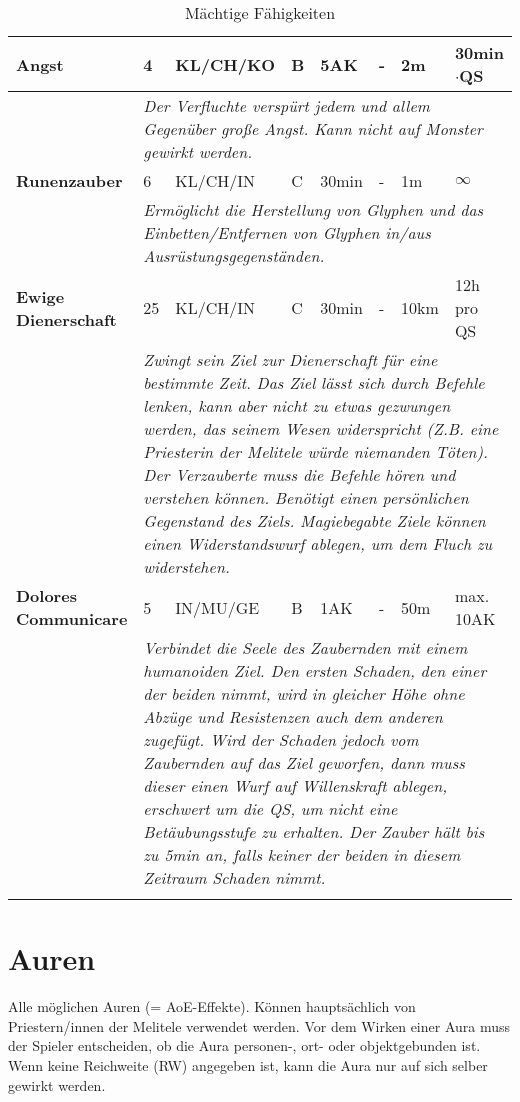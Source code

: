 \begin{longtable}{|p{4cm}|p{0.8cm}|p{2.2cm}|p{0.6cm}|p{1cm}|p{2.2cm}|p{0.9cm}|p{2.2cm}|}
\hline
\textbf{Angst} & 4 & KL/CH/KO & B & 5AK & - & 2m & 30min$\cdot$QS \\ \hline
\multicolumn{1}{r}{} & \multicolumn{7}{|p{13cm}|}{\textit{Der Verfluchte verspürt jedem und allem Gegenüber große Angst. Kann nicht auf Monster gewirkt werden.}} \\

\hline
\textbf{Runenzauber} & 6 & KL/CH/IN & C & 30min & - & 1m & $\infty$  \\ \hline
\multicolumn{1}{r}{} & \multicolumn{7}{|p{13cm}|}{\textit{Ermöglicht die Herstellung von Glyphen und das Einbetten/Entfernen von Glyphen in/aus Ausrüstungsgegenständen.}} \\

\hline
\textbf{Ewige Dienerschaft} & 25 & KL/CH/IN & C & 30min & - & 10km & 12h pro QS  \\ \hline
\multicolumn{1}{r}{} & \multicolumn{7}{|p{13cm}|}{\textit{Zwingt sein Ziel zur Dienerschaft für eine bestimmte Zeit. Das Ziel lässt sich durch Befehle lenken, kann aber nicht zu etwas gezwungen werden, das seinem Wesen widerspricht (Z.B. eine Priesterin der Melitele würde niemanden Töten). Der Verzauberte muss die Befehle hören und verstehen können. Benötigt einen persönlichen Gegenstand des Ziels. Magiebegabte Ziele können einen Widerstandswurf ablegen, um dem Fluch zu widerstehen.}} \\

\hline
\textbf{Dolores Communicare} & 5 & IN/MU/GE & B & 1AK & - & 50m & max. 10AK  \\ \hline
\multicolumn{1}{r}{} & \multicolumn{7}{|p{13cm}|}{\textit{Verbindet die Seele des Zaubernden mit einem humanoiden Ziel. Den ersten Schaden, den einer der beiden nimmt, wird in gleicher Höhe ohne Abzüge und Resistenzen auch dem anderen zugefügt. Wird der Schaden jedoch vom Zaubernden auf das Ziel geworfen, dann muss dieser einen Wurf auf Willenskraft ablegen, erschwert um die QS, um nicht eine Betäubungsstufe zu erhalten. Der Zauber hält bis zu 5min an, falls keiner der beiden in diesem Zeitraum Schaden nimmt.}} \\

\cline{2-8}
\caption{Mächtige Fähigkeiten}
\label{tab:MächtigeSkills}
\end{longtable}


\section{Auren}
Alle möglichen Auren (= AoE-Effekte). Können hauptsächlich von Priestern/innen der Melitele verwendet werden. Vor dem Wirken einer Aura muss der Spieler entscheiden, ob die Aura personen-, ort- oder objektgebunden ist. Wenn keine Reichweite (RW) angegeben ist, kann die Aura nur auf sich selber gewirkt werden.

